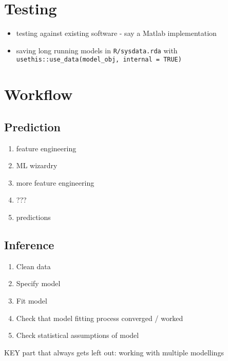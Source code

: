\documentclass[]{book}
\providecommand{\tightlist}{%
  \setlength{\itemsep}{0pt}\setlength{\parskip}{0pt}}
\theoremstyle{definition}
\theoremstyle{definition}
\theoremstyle{definition}
\theoremstyle{remark}
\begin{document}
\chapter{Testing}\label{testing}

\begin{itemize}
\tightlist
\item
  testing against existing software - say a Matlab implementation
\item
  saving long running models in \texttt{R/sysdata.rda} with
  \texttt{usethis::use\_data(model\_obj,\ internal\ =\ TRUE)}
\end{itemize}

\chapter{Workflow}\label{workflow}

\section{Prediction}\label{prediction}

\begin{enumerate}
\def\labelenumi{\arabic{enumi}.}
\tightlist
\item
  feature engineering
\item
  ML wizardry
\item
  more feature engineering
\item
  ???
\item
  predictions
\end{enumerate}

\section{Inference}\label{inference}

\begin{enumerate}
\def\labelenumi{\arabic{enumi}.}
\tightlist
\item
  Clean data
\item
  Specify model
\item
  Fit model
\item
  Check that model fitting process converged / worked
\item
  Check statistical assumptions of model
\end{enumerate}

KEY part that always gets left out: working with multiple modellings


\end{document}
